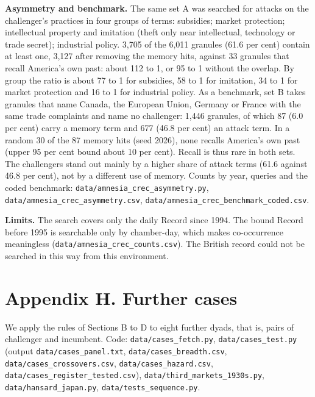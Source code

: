 \textbf{Asymmetry and benchmark.} The same set A was searched for
attacks on the challenger's practices in four groups of terms:
subsidies; market protection; intellectual property and imitation (theft
only near intellectual, technology or trade secret); industrial policy.
3,705 of the 6,011 granules (61.6 per cent) contain at least one, 3,127
after removing the memory hits, against 33 granules that recall
America's own past: about 112 to 1, or 95 to 1 without the overlap. By
group the ratio is about 77 to 1 for subsidies, 58 to 1 for imitation,
34 to 1 for market protection and 16 to 1 for industrial policy. As a
benchmark, set B takes granules that name Canada, the European Union,
Germany or France with the same trade complaints and name no challenger:
1,446 granules, of which 87 (6.0 per cent) carry a memory term and 677
(46.8 per cent) an attack term. In a random 30 of the 87 memory hits
(seed 2026), none recalls America's own past (upper 95 per cent bound
about 10 per cent). Recall is thus rare in both sets. The challengers
stand out mainly by a higher share of attack terms (61.6 against 46.8
per cent), not by a different use of memory. Counts by year, queries and
the coded benchmark: \texttt{data/\allowbreak{}amnesia\_\allowbreak{}crec\_\allowbreak{}asymmetry.py},
\texttt{data/\allowbreak{}amnesia\_\allowbreak{}crec\_\allowbreak{}asymmetry.csv},
\texttt{data/\allowbreak{}amnesia\_\allowbreak{}crec\_\allowbreak{}benchmark\_\allowbreak{}coded.csv}.

\textbf{Limits.} The search covers only the daily Record since 1994. The
bound Record before 1995 is searchable only by chamber-day, which makes
co-occurrence meaningless (\texttt{data/\allowbreak{}amnesia\_\allowbreak{}crec\_\allowbreak{}counts.csv}). The
British record could not be searched in this way from this environment.

\hypertarget{h.-further-cases}{%
\section*{Appendix H. Further cases}\label{h.-further-cases}}

We apply the rules of Sections B to D to eight further dyads, that is,
pairs of challenger and incumbent. Code: \texttt{data/\allowbreak{}cases\_\allowbreak{}fetch.py},
\texttt{data/\allowbreak{}cases\_\allowbreak{}test.py} (output \texttt{data/\allowbreak{}cases\_\allowbreak{}panel.txt},
\texttt{data/\allowbreak{}cases\_\allowbreak{}breadth.csv}, \texttt{data/\allowbreak{}cases\_\allowbreak{}crossovers.csv},
\texttt{data/\allowbreak{}cases\_\allowbreak{}hazard.csv},
\texttt{data/\allowbreak{}cases\_\allowbreak{}register\_\allowbreak{}tested.csv}),
\texttt{data/\allowbreak{}third\_\allowbreak{}markets\_\allowbreak{}1930s.py}, \texttt{data/\allowbreak{}hansard\_\allowbreak{}japan.py},
\texttt{data/\allowbreak{}tests\_\allowbreak{}sequence.py}.

